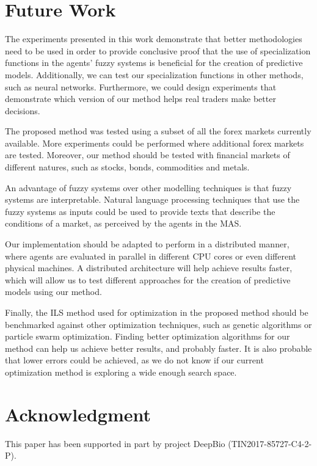 \documentclass{ieeeaccess}
\begin{document}
\section{Future Work}
\label{section:future-work}

The experiments presented in this work demonstrate that better
methodologies need to be used in order to provide conclusive proof
that the use of specialization functions in the agents' fuzzy systems is
beneficial for the creation of predictive models. Additionally, we can
test our specialization functions in other methods, such as neural
networks. Furthermore, we could design experiments that demonstrate
which version of our method helps real traders make better decisions.

The proposed method was tested using a subset of all the forex markets
currently available. More experiments could be performed where
additional forex markets are tested. Moreover, our method should be
tested with financial markets of different natures, such as stocks,
bonds, commodities and metals.

An advantage of fuzzy systems over other modelling techniques is that
fuzzy systems are interpretable. Natural language processing
techniques that use the fuzzy systems as inputs could be used to
provide texts that describe the conditions of a market, as perceived
by the agents in the MAS.

Our implementation should be adapted to perform in a distributed
manner, where agents are evaluated in parallel in different CPU cores
or even different physical machines. A distributed architecture will
help achieve results faster, which will allow us to test different
approaches for the creation of predictive models using our method.

Finally, the ILS method used for optimization in the proposed method should be
benchmarked against other optimization techniques, such as genetic
algorithms or particle swarm optimization. Finding better optimization
algorithms for our method can help us achieve better results, and probably faster. It is
also probable that lower errors could be achieved, as we do not know
if our current optimization method is exploring a wide enough search space.

\section*{Acknowledgment}
This paper has been supported in part by project DeepBio (TIN2017-85727-C4-2-P).
\end{document}
